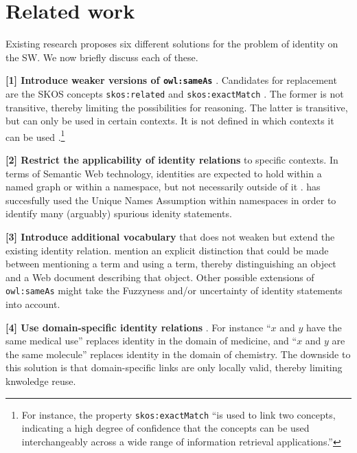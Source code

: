 \section{Related work}
\label{sec:related_work}

Existing research proposes six different solutions for
  the problem of identity on the SW.
We now briefly discuss each of these.

\textbf{[1] Introduce weaker versions of {\small \texttt{owl:sameAs}}}
  \cite{HalpinHayes2010,MccuskerMcguinness2010}.
Candidates for replacement are
  the SKOS concepts
  {\small \texttt{skos:related}} and {\small \texttt{skos:exactMatch}}
  \cite{MilesBechhofer2009}.
The former is not transitive,
  thereby limiting the possibilities for reasoning.
The latter is transitive,
  but can only be used in certain contexts.
It is not defined in which contexts it can be used
  \cite{MilesBechhofer2009}.\footnote{
    For instance, the property {\small \texttt{skos:exactMatch}}
    ``is used to link two concepts, indicating a high degree of confidence
    that the concepts can be used interchangeably across a wide range of
    information retrieval applications.''
  }
\begin{comment}
The problem with using weaker notions such as relatedness,
  is that everything is related to everything in \emph{some} way.}
\end{comment}

\textbf{[2] Restrict the applicability of identity relations}
  to specific contexts.
In terms of Semantic Web technology, identities are expected to hold
  within a named graph or within a namespace,
  but not necessarily outside of it \cite{HalpinHayes2010}.
\cite{Melo2013} has succesfully used the Unique Names Assumption
  within namespaces in order to identify many (arguably) spurious
  idenity statements.

\textbf{[3] Introduce additional vocabulary} that does not weaken but extend
  the existing identity relation.
\cite{HalpinHayes2010} mention an explicit distinction that could be made
  between mentioning a term and using a term,
  thereby distinguishing an object and a Web document describing that object.
Other possible extensions of {\small \texttt{owl:sameAs}} might take
  the Fuzzyness and/or uncertainty of identity statements into account.

\textbf{[4] Use domain-specific identity relations}
  \cite{MccuskerMcguinness2010}.
For instance
    ``$x$ and $y$ have the same medical use''
  replaces
    identity in the domain of medicine,
and
    ``$x$ and $y$ are the same molecule''
  replaces
    identity in the domain of chemistry.
The downside to this solution is that domain-specific links are
  only locally valid, thereby limiting knwoledge reuse.

